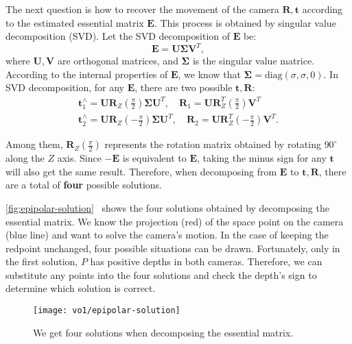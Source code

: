 The next question is how to recover the movement of the camera $\mathbf{R}, \mathbf{t}$ according to the estimated essential matrix $\mathbf{E}$. This process is obtained by singular value decomposition (SVD). Let the SVD decomposition of $\mathbf{E}$ be:
\begin{equation}
\mathbf{E} = \mathbf{U} \boldsymbol{\Sigma} \mathbf{V}^T,
\end{equation}
where $\mathbf{U}, \mathbf{V}$ are orthogonal matrices, and $\boldsymbol{\Sigma}$ is the  singular value matrice. According to the internal properties of $\mathbf{E}$, we know that $\boldsymbol{\Sigma} = \mathrm{diag}( \sigma, \sigma, 0 )$. In SVD decomposition, for any $\mathbf{E}$, there are two possible $\mathbf{t}, \mathbf{R}$:
\begin{equation}
\begin{array}{l}
\mathbf{t}_1^ \wedge  = \mathbf{U}{\mathbf{R}_Z}(\frac{\pi }{2}) \boldsymbol{\Sigma} {\mathbf{U}^T}, \quad {\mathbf{R}_1} = \mathbf{U} \mathbf{R}_Z^T(\frac{\pi }{2}){ \mathbf{V}^T}\\
\mathbf{t}_2^ \wedge  = \mathbf{U}{\mathbf{R}_Z}( - \frac{\pi }{2})\boldsymbol{\Sigma} {\mathbf{U}^T}, \quad  {\mathbf{R}_2} = \mathbf{U} \mathbf{R}_Z^T( - \frac{\pi }{2}){\mathbf{V}^T}.
\end{array}
\end{equation}

Among them, $\mathbf{R}_Z\left(\frac{\pi }{2}\right)$ represents the rotation matrix obtained by rotating $90^\circ$ along the $Z$ axis. Since $-\mathbf{E}$ is equivalent to $\mathbf{E}$, taking the minus sign for any $\mathbf{t}$ will also get the same result. Therefore, when decomposing from $\mathbf{E}$ to $\mathbf{t}, \mathbf{R}$, there are a total of \textbf{four} possible solutions.

\autoref{fig:epipolar-solution}~ shows the four solutions obtained by decomposing the essential matrix. We know the projection (red) of the space point on the camera (blue line) and want to solve the camera's motion. In the case of keeping the redpoint unchanged, four possible situations can be drawn. Fortunately, only in the first solution, $P$ has positive depths in both cameras. Therefore, we can substitute any points into the four solutions and check the depth's sign to determine which solution is correct.

\begin{figure}[!htp]
	\centering
	\texttt{[image: vo1/epipolar-solution]}
	\caption{We get four solutions when decomposing the essential matrix. }
	\label{fig:epipolar-solution}
\end{figure}

